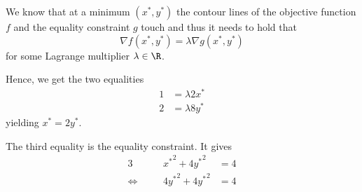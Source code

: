 We know that at a minimum $(x^\ast,y^\ast)$ the contour lines of the objective function $f$ and the equality constraint $g$ touch and thus it needs to hold that
\begin{equation*}
  \nabla f(x^\ast,y^\ast) = \lambda \nabla g(x^\ast,y^\ast)
\end{equation*}
for some Lagrange multiplier $\lambda \in \R$.

Hence, we get the two equalities
\begin{align*}
  1 &= \lambda 2 x^\ast \\
  2 &= \lambda 8 y^\ast
\end{align*}
yielding $x^\ast = 2 y^\ast$.

The third equality is the equality constraint.
It gives
\begin{alignat*}{3}
  && {x^\ast}^2 + 4{y^\ast}^2 &= 4 \\
  \Leftrightarrow \quad && 4{y^\ast}^2 + 4{y^\ast}^2 &= 4 \\
\end{alignat*}
